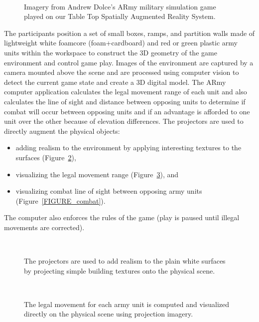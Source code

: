\documentclass[10pt]{article}
\begin{document}
\begin{figure}[h]
\centering
{} \\
\caption{ Imagery from Andrew Dolce's ARmy military simulation game
  played on our Table Top Spatially Augmented Reality System.}
\label{FIGURE_army_screenshots}
\end{figure}

The participants position a set of small boxes, ramps, and partition
walls made of lightweight white foamcore (foam+cardboard) and red or
green plastic army units within the workspace to construct the 3D
geometry of the game environment and control game play.  Images of the
environment are captured by a camera mounted above the scene and are
processed using computer vision to detect the current game state and
create a 3D digital model.  The ARmy computer application calculates
the legal movement range of each unit and also calculates the line of
sight and distance between opposing units to determine if combat will
occur between opposing units and if an advantage is afforded to one
unit over the other because of elevation differences.  The projectors are used to
directly augment the physical objects:
\begin{itemize}
\item adding realism to the environment by applying interesting textures
to the surfaces (Figure~\ref{FIGURE_realism}),
\item
 visualizing the legal movement range (Figure~\ref{FIGURE_movement}), and
%
\item visualizing combat line of sight between opposing army units
(Figure~\ref{FIGURE_combat}).
\end{itemize}
%
 The computer also enforces the rules of the game
(play is paused until illegal movements are corrected).

\begin{figure}[t]
\centering
{}
 \\
\caption{ The projectors are used to add realism to the plain white
  surfaces by projecting simple building textures onto the physical scene.}
\label{FIGURE_realism}
\end{figure}

\begin{figure}[t]
\centering
{}
 \\
\caption{ The legal movement for each army unit is computed and visualized
  directly on the physical scene using projection imagery.}
\label{FIGURE_movement}
\end{figure}
\end{document}

